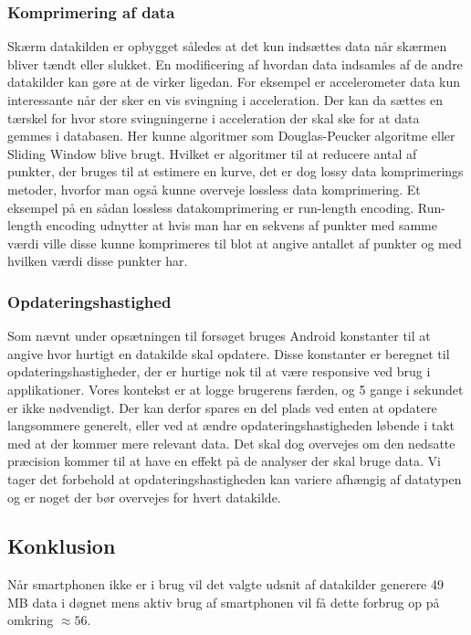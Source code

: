 \subsubsection{Komprimering af data}\label{sec:opryd}
Skærm datakilden er opbygget således at det kun indsættes data når skærmen bliver tændt eller slukket.
En modificering af hvordan data indsamles af de andre datakilder kan gøre at de virker ligedan. 
For eksempel er accelerometer data kun interessante når der sker en vis svingning i acceleration.
Der kan da sættes en tærskel for hvor store svingningerne i acceleration der skal ske for at data gemmes i databasen.
Her kunne algoritmer som Douglas-Peucker algoritme eller Sliding Window blive brugt.
Hvilket er algoritmer til at reducere antal af punkter, der bruges til at estimere en kurve, det er dog lossy data komprimerings metoder, hvorfor man også kunne overveje lossless data komprimering.
Et eksempel på en sådan lossless datakomprimering er run-length encoding.
Run-length encoding udnytter at hvis man har en sekvens af punkter med samme værdi ville disse kunne komprimeres til blot at angive antallet af punkter og med hvilken værdi disse punkter har.

\subsubsection{Opdateringshastighed}
Som nævnt under opsætningen til forsøget bruges Android konstanter til at angive hvor hurtigt en datakilde skal opdatere.
Disse konstanter er beregnet til opdateringshastigheder, der er hurtige nok til at være responsive ved brug i applikationer.
Vores kontekst er at logge brugerens færden, og 5 gange i sekundet er ikke nødvendigt.
Der kan derfor spares en del plads ved enten at opdatere langsommere generelt, eller ved at ændre opdateringshastigheden løbende i takt med at der kommer mere relevant data.
Det skal dog overvejes om den nedsatte præcision kommer til at have en effekt på de analyser der skal bruge data.
Vi tager det forbehold at opdateringshastigheden kan variere afhængig af datatypen og er noget der bør overvejes for hvert datakilde.

\subsection{Konklusion}
Når smartphonen ikke er i brug vil det valgte udsnit af datakilder generere 49 MB data i døgnet mens aktiv brug af smartphonen vil få dette forbrug op på omkring $\approx56$.

